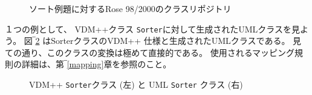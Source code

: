 \documentclass[\pformat,12pt]{jarticle}
\newcommand{\vdmpp}{VDM++}
\newcommand{\rose}{Rose 98/2000}
\begin{document}
\begin{figure}[htb]
\begin{center}
\mbox{}
\caption{ソート例題に対する\rose{}のクラスリポジトリ　\label{fig:classrepository}}
\end{center}
\end{figure}

１つの例として、 \vdmpp{}クラス {\tt Sorter}に対して生成されたUMLクラスを見よう。
図‾\ref{fig:SorterVDMUML} はSorterクラスの\vdmpp{} 仕様と生成されたUMLクラスである。
見ての通り、このクラスの変換は極めて直接的である。
使用されるマッピング規則の詳細は、第‾\ref{mapping}章を参照のこと。


\begin{figure}[htb]
\begin{center}
\hspace{-1.5cm}
\hspace{0.2cm}
\caption{\vdmpp{} {\tt Sorter}クラス (左) と UML {\tt Sorter} クラス (右)　\label{fig:SorterVDMUML}}
\end{center}
\end{figure}
\end{document}
